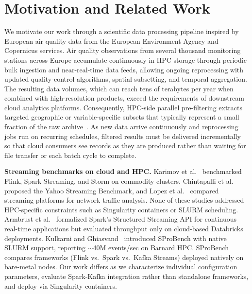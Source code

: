 \documentclass[runningheads]{llncs}
\begin{document}
\section{Motivation and Related Work}
\label{sec:related}

We motivate our work through a scientific data processing pipeline inspired by European air quality data from the European Environment Agency and Copernicus services. Air quality observations from several thousand monitoring stations across Europe accumulate continuously in HPC storage through periodic bulk ingestion and near-real-time data feeds, allowing ongoing reprocessing with updated quality-control algorithms, spatial subsetting, and temporal aggregation. The resulting data volumes, which can reach tens of terabytes per year when combined with high-resolution products, exceed the requirements of downstream cloud analytics platforms. Consequently, HPC-side parallel pre-filtering extracts targeted geographic or variable-specific subsets that typically represent a small fraction of the raw archive~\cite{extract2023}. As new data arrive continuously and reprocessing jobs run on recurring schedules, filtered results must be delivered incrementally so that cloud consumers see records as they are produced rather than waiting for file transfer or each batch cycle to complete.


\textbf{Streaming benchmarks on cloud and HPC.} Karimov et al.~\cite{karimov2018benchmarking} benchmarked Flink, Spark Streaming, and Storm on commodity clusters. Chintapalli et al.~\cite{chintapalli2016benchmarking} proposed the Yahoo Streaming Benchmark, and Lopez et al.~\cite{lopez2016performance} compared streaming platforms for network traffic analysis. None of these studies addressed HPC-specific constraints such as Singularity containers or SLURM scheduling. Armbrust et al.~\cite{armbrust2018structured} formalized Spark's Structured Streaming API for continuous real-time applications but evaluated throughput only on cloud-based Databricks deployments. Kulkarni and Ghiasvand~\cite{kulkarni2025sprobench} introduced SProBench with native SLURM support, reporting $\sim$40M events/sec on Barnard HPC. SProBench compares frameworks (Flink vs.\ Spark vs.\ Kafka Streams) deployed natively on bare-metal nodes. Our work differs as we characterize individual configuration parameters, evaluate Spark-Kafka integration rather than standalone frameworks, and deploy via Singularity containers. 
\end{document}

